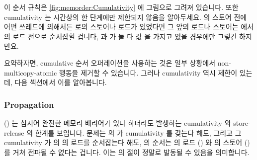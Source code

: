 \begin{fcvref}
이 순서 규칙은
\cref{fig:memorder:Cumulativity} 에 그림으로 그려져 있습니다.
또한 cumulativity 는 시간상의 한 단계에만 제한되지 않음을 알아두세요.
 의 스토어 전에 어떤 쓰레드에 의해서든  로의 스토어나 로드가
있었다면 그 앞의 로드나 스토어는  에서의 로드 전으로 순서잡힐
겁니다,  과  가 둘 다 값  을 가지고 있을 경우에만 그렇긴
하지만요.
\end{fcvref}

요약하자면, cumulative 순서 오퍼레이션을 사용하는 것은 일부 상황에서
non-multicopy-atomic 행동을 제거할 수 있습니다.
그러나 cumulativity 역시 제한이 있는데, 다음 섹션에서 이를 알아봅니다.

\subsubsection{Propagation}
\label{sec:memorder:Propagation}

\begin{fcvref}
()
는 심지어 완전한 메모리 배리어가 있다 하더라도 발생하는 cumulativity 와
store-release 의 한계를 보입니다.
문제는  의  가 cumulativity 를 갖는다
해도, 그리고 그 cumulativity 가  의  의 로드를
순서잡는다 해도,  의 순서는  의 로드
() 와  의 스토어 () 를 거쳐 전파될 수
없다는 겁니다.
이는  의  절이 정말로 발동될 수 있음을 의미합니다.
\end{fcvref}

